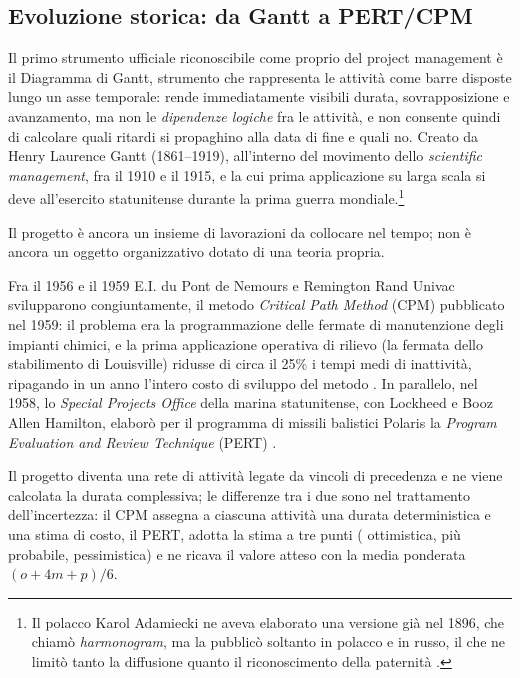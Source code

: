 \subsection{Evoluzione storica: da Gantt a PERT/CPM}

Il primo strumento ufficiale riconoscibile come proprio del project management
\`e il Diagramma di Gantt, strumento che rappresenta le attivit\`a come barre
disposte lungo un asse temporale: rende immediatamente visibili durata,
sovrapposizione e avanzamento, ma non le \emph{dipendenze logiche} fra le
attivit\`a, e non consente quindi di calcolare quali ritardi si propaghino alla
data di fine e quali no. Creato da Henry Laurence Gantt (1861--1919),
all'interno del movimento dello \emph{scientific management}, fra il 1910 e il
1915, e la cui prima applicazione su larga scala si deve all'esercito
statunitense durante la prima guerra mondiale.\footnote{Il polacco Karol
Adamiecki ne aveva elaborato una versione gi\`a nel 1896, che chiam\`o
\emph{harmonogram}, ma la pubblic\`o soltanto in polacco e in russo, il che ne
limit\`o tanto la diffusione quanto il riconoscimento della paternit\`a
\cite{marsh1975}.}

Il progetto \`e ancora un insieme di lavorazioni da collocare nel tempo; non \`e
ancora un oggetto organizzativo dotato di una teoria propria.

Fra il 1956 e il 1959 E.I. du Pont de Nemours e Remington Rand Univac
svilupparono congiuntamente, il metodo \emph{Critical Path Method} (CPM)
pubblicato nel 1959: il problema era la programmazione delle fermate di
manutenzione degli impianti chimici, e la prima applicazione operativa di
rilievo (la fermata dello stabilimento di Louisville) ridusse di circa il
25\% i tempi medi di inattivit\`a, ripagando in un anno l'intero costo di
sviluppo del metodo \cite{kelley1989}. In parallelo, nel 1958, lo \emph{Special
Projects Office} della marina statunitense, con Lockheed e Booz Allen Hamilton,
elabor\`o per il programma di missili balistici Polaris la \emph{Program
Evaluation and Review Technique} (PERT) \cite{malcolm1959}.

Il progetto diventa una rete di attivit\`a legate da vincoli di precedenza e ne
viene calcolata la durata complessiva; le differenze tra i due sono nel
trattamento dell'incertezza: il CPM assegna a ciascuna attivit\`a una durata
deterministica e una stima di costo, il PERT, adotta la stima a tre punti (
ottimistica, pi\`u probabile, pessimistica) e ne ricava il valore atteso con
la media ponderata $(o + 4m + p)/6$.

